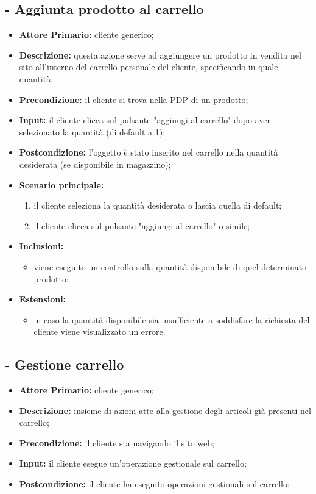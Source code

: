 \stepUserCase
\subsection{ - Aggiunta prodotto al carrello}
\begin{itemize}
    \item \textbf{Attore Primario:} cliente generico;
    \item \textbf{Descrizione:} questa azione serve ad aggiungere un prodotto in vendita nel sito
                                all'interno del carrello personale del cliente, specificando in quale quantità;
    \item \textbf{Precondizione:} il cliente si trova nella PDP di un prodotto;
    \item \textbf{Input:} il cliente clicca sul pulsante "aggiungi al carrello" dopo aver selezionato la quantità (di default a 1);
    \item \textbf{Postcondizione:} l'oggetto è stato inserito nel carrello nella quantità desiderata (se disponibile in magazzino);
    \item \textbf{Scenario principale:}
    \begin{enumerate}
        \item il cliente seleziona la quantità desiderata o lascia quella di default;
        \item il cliente clicca sul pulsante "aggiungi al carrello" o simile;
    \end{enumerate}
    \item \textbf{Inclusioni:}
    \begin{itemize}
        \item viene eseguito un controllo sulla quantità disponibile di quel determinato prodotto;
    \end{itemize}
    \item \textbf{Estensioni:}
    \begin{itemize}
        \item in caso la quantità disponibile sia insufficiente a soddisfare la richiesta del cliente viene visualizzato un errore.
    \end{itemize}
\end{itemize}

\stepUserCase
\subsection{ - Gestione carrello}
\begin{itemize}
    \item \textbf{Attore Primario:} cliente generico;
    \item \textbf{Descrizione:} insieme di azioni atte alla gestione degli articoli già presenti nel carrello;
    \item \textbf{Precondizione:} il cliente sta navigando il sito web;
    \item \textbf{Input:} il cliente esegue un'operazione gestionale sul carrello;
    \item \textbf{Postcondizione:} il cliente ha eseguito operazioni gestionali sul carrello;
\end{itemize}

